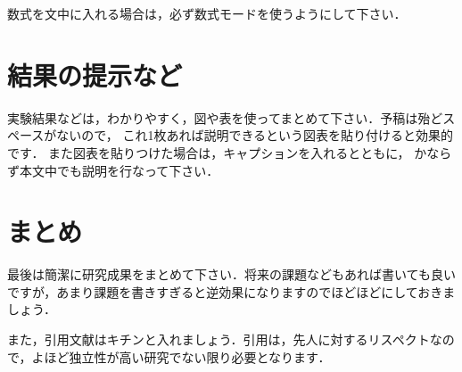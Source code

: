 \documentclass[twocolumn, a4paper]{UECIEresume}
\begin{document}
数式を文中に入れる場合は，必ず数式モードを使うようにして下さい．

\section{結果の提示など}

実験結果などは，わかりやすく，図や表を使ってまとめて下さい．予稿は殆どスペースがないので，
これ1枚あれば説明できるという図表を貼り付けると効果的です．
また図表を貼りつけた場合は，キャプションを入れるとともに，
かならず本文中でも説明を行なって下さい．

\section{まとめ}

最後は簡潔に研究成果をまとめて下さい．将来の課題などもあれば書いても良いですが，あまり課題を書きすぎると逆効果になりますのでほどほどにしておきましょう．

また，引用文献はキチンと入れましょう\cite{Kinoshita}．引用は，先人に対するリスペクトなので，よほど独立性が高い研究でない限り必要となります．

{\small


}
\end{document}
